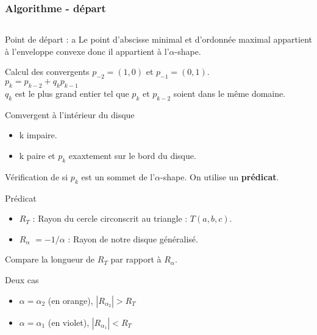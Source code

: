 \begin{frame}
\frametitle{Algorithme - départ}

\begin{columns}[t]
  \begin{column}{0.7\linewidth}
    {
      \begin{block}{Point de départ : a}
        Le point d'abscisse minimal et d'ordonnée maximal appartient à l'enveloppe convexe donc il appartient à l'$\alpha$-shape.\\
      \end{block}
    }
    {  
      \begin{block}{Calcul des convergents}
        $p_{-2} = (1,0)$ et $p_{-1} = (0,1)$.\\
        $p_{k} = p_{k-2} + q_k p_{k-1}$\\
        $q_k$ est le plus grand entier tel que $p_{k}$ et $p_{k-2}$ soient dans le même domaine.
      \end{block}
    }
    {
      \begin{block}{Comvergent à l'intérieur du disque}
        \begin{itemize}
          \item k impaire.
          \item k paire et $p_k$ exaxtement sur le bord du disque.
        \end{itemize}
        Vérification de si $p_k$ est un sommet de l'$\alpha$-shape.
        On utilise un \textbf{prédicat}.
      \end{block}
    }
    {
      \begin{block}{Prédicat}
      \begin{itemize}
        \item \textbf{$R_T$} : Rayon du cercle circonscrit au triangle : $T(a, b, c)$.
        \item \textbf{$R_{\alpha}$} $= -1/\alpha$ : Rayon de notre disque généralisé.
      \end{itemize}      
        Compare la longueur de \textbf{$R_T$} par rapport à \textbf{$R_{\alpha}$}.\\
      \end{block}
      
      \begin{alertblock}{Deux cas}
        \begin{itemize}
          \item $\alpha = \alpha_{2}$ (en orange), \textbf{$|R_{\alpha_{2}}| > R_T$}
          \item $\alpha = \alpha_{1}$ (en violet), \textbf{$|R_{\alpha_{1}}| < R_T$}
        \end{itemize}
       \end{alertblock}
    }


\end{column}
\end{columns}
\end{frame}
